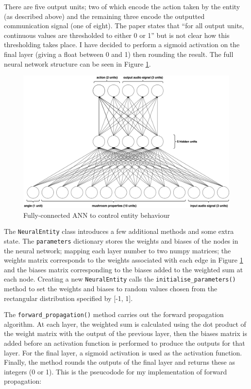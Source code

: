 \documentclass[12pt,a4paper,twoside,openright]{report}
\begin{document}
There are five output units; two of which encode the action taken by the entity (as described above) and the remaining three encode the outputted communication signal (one of eight). The paper states that ``for all output units, continuous values are thresholded to either 0 or 1'' but is not clear how this thresholding takes place. I have decided to perform a sigmoid activation on the final layer (giving a float between 0 and 1) then rounding the result. The full neural network structure can be seen in Figure \ref{fig:fullneural}.

\begin{figure}[t]
  \centering
  \includegraphics[width=.9\linewidth]{figs/fullneural}
  \caption{Fully-connected ANN to control entity behaviour}
  \label{fig:fullneural}
\end{figure}

The \texttt{NeuralEntity} class introduces a few additional methods and some extra state. The \texttt{parameters} dictionary stores the weights and biases of the nodes in the neural network; mapping each layer number to two numpy matrices; the weights matrix corresponds to the weights associated with each edge in Figure \ref{fig:fullneural} and the biases matrix corresponding to the biases added to the weighted sum at each node. Creating a new \texttt{NeuralEntity} calls the \texttt{initialise\_parameters()} method to set the weights and biases to random values chosen from the rectangular distribution specified by [-1, 1].

The \texttt{forward\_propagation()} method carries out the forward propagation algorithm. At each layer, the weighted sum is calculated using the dot product of the weight matrix with the output of the previous layer, then the biases matrix is added before an activation function is performed to produce the outputs for that layer. For the final layer, a sigmoid activation is used as the activation function. Finally, the method rounds the outputs of the final layer and returns these as integers (0 or 1). This is the pseucodode for my implementation of forward propagation: 
\end{document}
